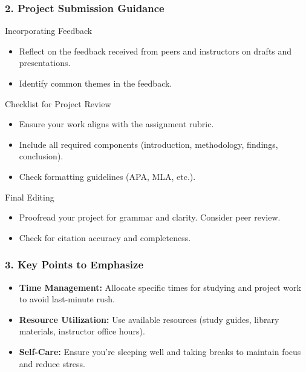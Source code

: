 \documentclass{beamer}
\begin{document}
\begin{frame}[fragile]
    \frametitle{2. Project Submission Guidance}
    \begin{block}{Incorporating Feedback}
        \begin{itemize}
            \item Reflect on the feedback received from peers and instructors on drafts and presentations.
            \item Identify common themes in the feedback.
        \end{itemize}
    \end{block}

    \begin{block}{Checklist for Project Review}
        \begin{itemize}
            \item Ensure your work aligns with the assignment rubric.
            \item Include all required components (introduction, methodology, findings, conclusion).
            \item Check formatting guidelines (APA, MLA, etc.).
        \end{itemize}
    \end{block}

    \begin{block}{Final Editing}
        \begin{itemize}
            \item Proofread your project for grammar and clarity. Consider peer review.
            \item Check for citation accuracy and completeness.
        \end{itemize}
    \end{block}
\end{frame}

\begin{frame}[fragile]
    \frametitle{3. Key Points to Emphasize}
    \begin{itemize}
        \item \textbf{Time Management:} Allocate specific times for studying and project work to avoid last-minute rush.
        \item \textbf{Resource Utilization:} Use available resources (study guides, library materials, instructor office hours).
        \item \textbf{Self-Care:} Ensure you’re sleeping well and taking breaks to maintain focus and reduce stress.
    \end{itemize}
\end{frame}
\end{document}
